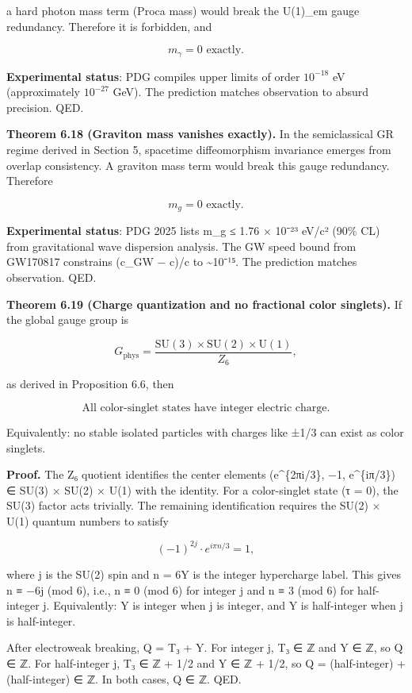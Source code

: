 a hard photon mass term (Proca mass) would break the U(1)\_em gauge redundancy. Therefore it is forbidden, and

\[
m_\gamma = 0 \text{ exactly.}
\]

\textbf{Experimental status}: PDG compiles upper limits of order \(10^{-18}\) eV (approximately \(10^{-27}\) GeV). The prediction matches observation to absurd precision. QED.

\textbf{Theorem 6.18 (Graviton mass vanishes exactly).} In the semiclassical GR regime derived in Section 5, spacetime diffeomorphism invariance emerges from overlap consistency. A graviton mass term would break this gauge redundancy. Therefore

\[
m_g = 0 \text{ exactly.}
\]

\textbf{Experimental status}: PDG 2025 lists m\_g ≤ 1.76 × 10⁻²³ eV/c² (90\% CL) from gravitational wave dispersion analysis. The GW speed bound from GW170817 constrains (c\_GW − c)/c to \textasciitilde10⁻¹⁵. The prediction matches observation. QED.

\textbf{Theorem 6.19 (Charge quantization and no fractional color singlets).} If the global gauge group is

\[
G_{\mathrm{phys}} = \frac{\mathrm{SU}(3) \times \mathrm{SU}(2) \times \mathrm{U}(1)}{Z_6},
\]

as derived in Proposition 6.6, then

\[
\text{All color-singlet states have integer electric charge.}
\]

Equivalently: no stable isolated particles with charges like ±1/3 can exist as color singlets.

\textbf{Proof.} The Z₆ quotient identifies the center elements (e\^{}\{2πi/3\}, −1, e\^{}\{iπ/3\}) ∈ SU(3) × SU(2) × U(1) with the identity. For a color-singlet state (τ = 0), the SU(3) factor acts trivially. The remaining identification requires the SU(2) × U(1) quantum numbers to satisfy

\[
(-1)^{2j} \cdot e^{i\pi n/3} = 1,
\]

where j is the SU(2) spin and n = 6Y is the integer hypercharge label. This gives n ≡ −6j (mod 6), i.e., n ≡ 0 (mod 6) for integer j and n ≡ 3 (mod 6) for half-integer j. Equivalently: Y is integer when j is integer, and Y is half-integer when j is half-integer.

After electroweak breaking, Q = T₃ + Y. For integer j, T₃ ∈ ℤ and Y ∈ ℤ, so Q ∈ ℤ. For half-integer j, T₃ ∈ ℤ + 1/2 and Y ∈ ℤ + 1/2, so Q = (half-integer) + (half-integer) ∈ ℤ. In both cases, Q ∈ ℤ. QED.

